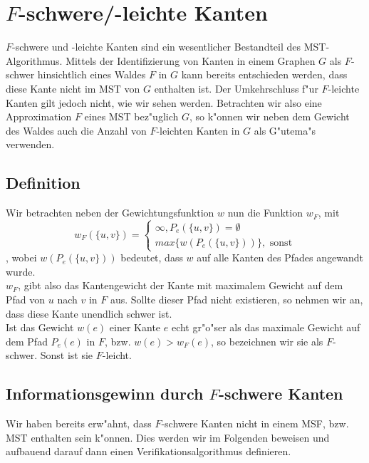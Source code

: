 \section{$F$-schwere/-leichte Kanten}
\label{sec:fEdg}

$F$-schwere und -leichte Kanten sind ein wesentlicher Bestandteil des 
    MST-Algorithmus. Mittels der Identifizierung von Kanten in einem Graphen $G$
    als $F$-schwer hinsichtlich eines Waldes $F$ in $G$ kann
    bereits entschieden werden, dass diese Kante nicht im MST von $G$ enthalten
    ist. Der Umkehrschluss f"ur $F$-leichte Kanten gilt jedoch nicht, wie wir
    sehen werden.
    Betrachten wir also eine Approximation $F$ eines MST bez"uglich $G$, so k"onnen
    wir neben dem Gewicht des Waldes auch die Anzahl von $F$-leichten Kanten in $G$ als
    G"utema"s verwenden.\\

\subsection{Definition}

Wir betrachten neben der Gewichtungsfunktion $w$ nun die Funktion $w_F$, mit
    $$
    w_F(\{u,v\}) =  \begin{cases}
                        \infty, P_e(\{u,v\}) = \emptyset\\
                        max\{w(P_e(\{u,v\}))\}, \text{ sonst}
                    \end{cases}
    $$
, wobei $w(P_e(\{u,v\}))$ bedeutet, dass $w$ auf alle Kanten des Pfades angewandt
    wurde.\\
$w_F$, gibt also das Kantengewicht der Kante mit maximalem Gewicht auf dem
    Pfad von $u$ nach $v$ in $F$ aus. Sollte dieser Pfad nicht existieren, so
    nehmen wir an, dass diese Kante unendlich schwer ist.\\
Ist das Gewicht $w(e)$ einer Kante $e$ echt gr"o"ser als das maximale Gewicht auf dem 
    Pfad $P_e(e)$ in $F$, bzw. $w(e) > w_F(e)$, 
    so bezeichnen wir sie als $F$-schwer.
    Sonst ist sie $F$-leicht.

\subsection{Informationsgewinn durch $F$-schwere Kanten}

Wir haben bereits erw"ahnt, dass $F$-schwere Kanten nicht in einem MSF, bzw. MST
    enthalten sein k"onnen.
    Dies werden wir im Folgenden beweisen
    und aufbauend darauf dann einen Verifikationsalgorithmus definieren.\\

